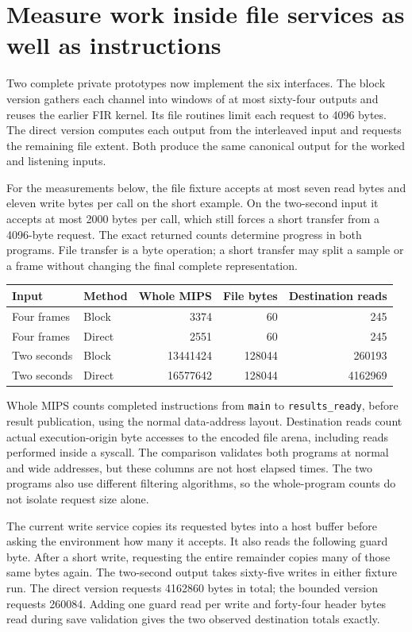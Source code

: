 \section{Measure work inside file services as well as instructions}
Two complete private prototypes now implement the six interfaces. The block version
gathers each channel into windows of at most sixty-four outputs and reuses the earlier
FIR kernel. Its file routines limit each request to 4096 bytes. The direct version
computes each output from the interleaved input and requests the remaining file extent.
Both produce the same canonical output for the worked and listening inputs.

For the measurements below, the file fixture accepts at most seven read bytes and
eleven write bytes per call on the short example. On the two-second input it accepts
at most 2000 bytes per call, which still forces a short transfer from a 4096-byte request.
The exact returned counts determine progress in both programs. File transfer is a byte
operation; a short transfer may split a sample or a frame without changing the final
complete representation.

\begin{center}
\begin{tabular}{llrrr}
Input & Method & Whole MIPS & File bytes & Destination reads \\
\hline
Four frames & Block & 3374 & 60 & 245 \\
Four frames & Direct & 2551 & 60 & 245 \\
Two seconds & Block & 13441424 & 128044 & 260193 \\
Two seconds & Direct & 16577642 & 128044 & 4162969 \\
\end{tabular}
\end{center}

Whole MIPS counts completed instructions from \texttt{main} to
\texttt{results\_ready}, before result publication, using the normal data-address
layout. Destination reads count actual execution-origin byte accesses to the encoded
file arena, including reads performed inside a syscall. The comparison validates both
programs at normal and wide addresses, but these columns are not host elapsed times.
The two programs also use different filtering algorithms, so the whole-program counts
do not isolate request size alone.

The current write service copies its requested bytes into a host buffer before asking
the environment how many it accepts. It also reads the following guard byte. After a
short write, requesting the entire remainder copies many of those same bytes again.
The two-second output takes sixty-five writes in either fixture run. The direct
version requests 4162860 bytes in total; the bounded version requests 260084. Adding
one guard read per write and forty-four header bytes read during save validation gives
the two observed destination totals exactly.

